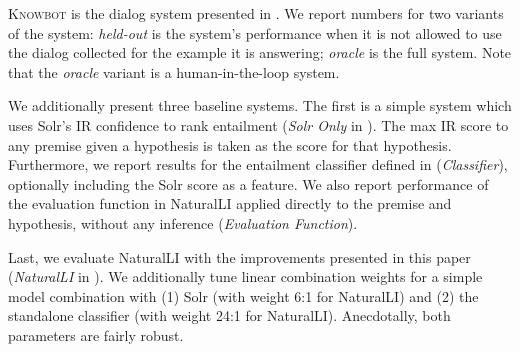 \textsc{Knowbot} is the dialog system presented in 
  .
We report numbers for two variants of the system:
  \textit{held-out} is the system's performance when it is not allowed
  to use the dialog collected for the example it is answering;
  \textit{oracle} is the full system.
Note that the \textit{oracle} variant is a human-in-the-loop system.

We additionally present three baseline systems.
The first is a simple system which uses Solr's IR confidence to rank
  entailment (\textit{Solr Only} in ).
The max IR score to any premise given a hypothesis is taken
  as the score for that hypothesis.
Furthermore, we report results for the entailment classifier defined
  in  (\textit{Classifier}), optionally
  including the Solr score as a feature.
We also report performance of the evaluation function in NaturalLI
  applied directly to the premise and hypothesis, without any inference
  (\textit{Evaluation Function}).

Last, we evaluate NaturalLI with the improvements presented in this paper
  (\textit{NaturalLI} in ).
We additionally tune linear combination weights for a 
  simple model combination with
  (1) Solr (with weight 6:1 for NaturalLI) and 
  (2) the standalone classifier (with weight 24:1 for NaturalLI).
Anecdotally, both parameters are fairly robust.


%
%



